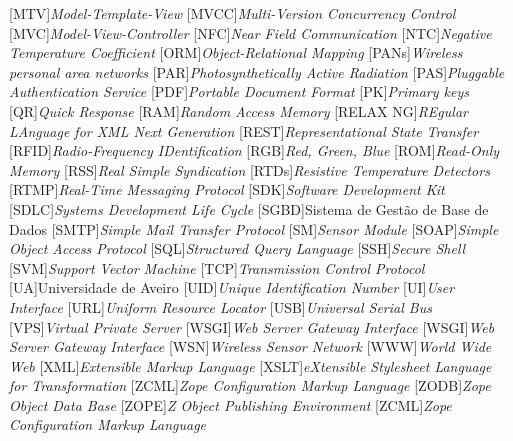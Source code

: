\begin{multicols}{2}
\begin{acronym}[RELAX NG]
	[MTV]{\textit{Model-Template-View}}
	[MVCC]{\textit{Multi-Version Concurrency Control}}
	[MVC]{\textit{Model-View-Controller}}
	[NFC]{\textit{Near Field Communication}}
	[NTC]{\textit{Negative Temperature Coefficient}}
	[ORM]{\textit{Object-Relational Mapping}}
	[PANs]{\textit{Wireless personal area networks}}
	[PAR]{\textit{Photosynthetically Active Radiation}}
	[PAS]{\textit{Pluggable Authentication Service}}
	[PDF]{\textit{Portable Document Format}}
	[PK]{\textit{Primary keys}}
	[QR]{\textit{Quick Response}}
	[RAM]{\textit{Random Access Memory}}
	[RELAX NG]{\textit{REgular LAnguage for XML Next Generation}}
	[REST]{\textit{Representational State Transfer}}
	[RFID]{\textit{Radio-Frequency IDentification}}
	[RGB]{\textit{Red, Green, Blue}}
	[ROM]{\textit{Read-Only Memory}}
	[RSS]{\textit{Real Simple Syndication}}
	[RTDs]{\textit{Resistive Temperature Detectors}}
	[RTMP]{\textit{Real-Time Messaging Protocol}}
	[SDK]{\textit{Software Development Kit}}
	[SDLC]{\textit{Systems Development Life Cycle}}
	[SGBD]{Sistema de Gestão de Base de Dados}
	[SMTP]{\textit{Simple Mail Transfer Protocol}}
	[SM]{\textit{Sensor Module}}
	[SOAP]{\textit{Simple Object Access Protocol}}
	[SQL]{\textit{Structured Query Language}}
	[SSH]{\textit{Secure Shell}}
	[SVM]{\textit{Support Vector Machine}}
	[TCP]{\textit{Transmission Control Protocol}}
	[UA]{Universidade de Aveiro}
	[UID]{\textit{Unique Identification Number}}
	[UI]{\textit{User Interface}}
	[URL]{\textit{Uniform Resource Locator}}
	[USB]{\textit{Universal Serial Bus}}
	[VPS]{\textit{Virtual Private Server }}
	[WSGI]{\textit{Web Server Gateway Interface }}
	[WSGI]{\textit{Web Server Gateway Interface}}
	[WSN]{\textit{Wireless Sensor Network}}
	[WWW]{\textit{World Wide Web}}
	[XML]{\textit{Extensible Markup Language}}
	[XSLT]{\textit{eXtensible Stylesheet Language for Transformation}}
	[ZCML]{\textit{Zope Configuration Markup Language}}
	[ZODB]{\textit{Zope Object Data Base}}
	[ZOPE]{\textit{Z Object Publishing Environment}}
	[ZCML]{\textit{Zope Configuration Markup Language}}
	
\end{acronym}

\end{multicols}

